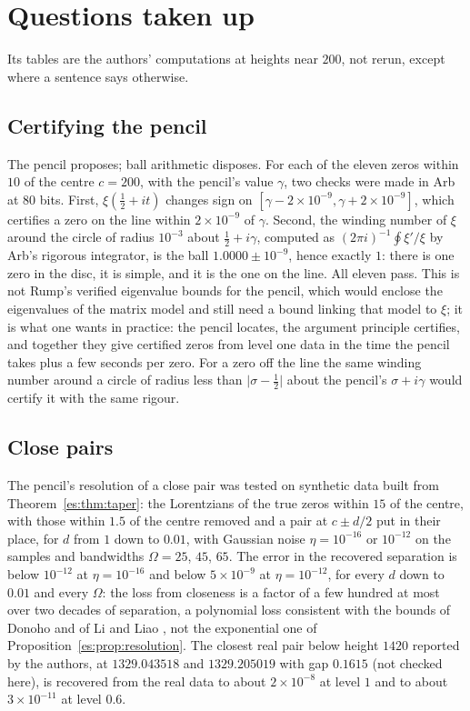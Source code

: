 \section{Questions taken up}\label{es:sec:worked}

Its tables are the authors' computations at heights near $200$, not rerun, except where a sentence says otherwise.

\subsection{Certifying the pencil}\label{es:sec:certpencil}

The pencil proposes; ball arithmetic disposes. For each of the eleven zeros within $10$ of the centre $c=200$, with the pencil's value $\gamma$, two checks were made in Arb at $80$ bits. First, $\xi(\tfrac12+it)$ changes sign on $[\gamma-2\times10^{-9},\gamma+2\times10^{-9}]$, which certifies a zero on the line within $2\times10^{-9}$ of $\gamma$. Second, the winding number of $\xi$ around the circle of radius $10^{-3}$ about $\tfrac12+i\gamma$, computed as $(2\pi i)^{-1}\oint\xi'/\xi$ by Arb's rigorous integrator, is the ball $1.0000\pm10^{-9}$, hence exactly $1$: there is one zero in the disc, it is simple, and it is the one on the line. All eleven pass. This is not Rump's verified eigenvalue bounds \cite{Rump10} for the pencil, which would enclose the eigenvalues of the matrix model and still need a bound linking that model to $\xi$; it is what one wants in practice: the pencil locates, the argument principle certifies, and together they give certified zeros from level one data in the time the pencil takes plus a few seconds per zero. For a zero off the line the same winding number around a circle of radius less than $\lvert\sigma-\tfrac12\rvert$ about the pencil's $\sigma+i\gamma$ would certify it with the same rigour.

\subsection{Close pairs}

The pencil's resolution of a close pair was tested on synthetic data built from Theorem~\ref{es:thm:taper}: the Lorentzians of the true zeros within $15$ of the centre, with those within $1.5$ of the centre removed and a pair at $c\pm d/2$ put in their place, for $d$ from $1$ down to $0.01$, with Gaussian noise $\eta=10^{-16}$ or $10^{-12}$ on the samples and bandwidths $\Omega=25$, $45$, $65$. The error in the recovered separation is below $10^{-12}$ at $\eta=10^{-16}$ and below $5\times10^{-9}$ at $\eta=10^{-12}$, for every $d$ down to $0.01$ and every $\Omega$: the loss from closeness is a factor of a few hundred at most over two decades of separation, a polynomial loss consistent with the bounds of Donoho and of Li and Liao \cite{Donoho92,LiLiao21}, not the exponential one of Proposition~\ref{es:prop:resolution}. The closest real pair below height $1420$ reported by the authors, at $1329.043518$ and $1329.205019$ with gap $0.1615$ (not checked here), is recovered from the real data to about $2\times10^{-8}$ at level $1$ and to about $3\times10^{-11}$ at level $0.6$.

